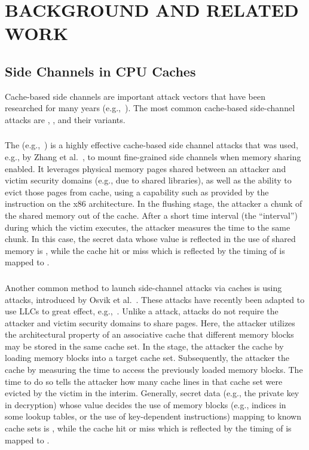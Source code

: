 \chapter{\uppercase{Background and Related Work}}
\label{chap:background}

\section{Side Channels in CPU Caches}
Cache-based side channels are important attack vectors that have been
researched for many years
(e.g.,~\cite{zhang2014cross,yarom2014flush,liu2015practical}).  The
most common cache-based side-channel attacks are \primeprobe,
\flushreload, and their variants.

\subsection{\flushreload}
The \flushreload (e.g.,~\cite{zhang2014cross,yarom2014flush})
is a highly effective cache-based side channel attacks that was used,
e.g., by Zhang et al.~\cite{zhang2014cross}, to mount fine-grained side
channels when memory sharing enabled.  It leverages physical memory
pages shared between an attacker and victim security domains (e.g.,
due to shared libraries), as well as the ability to evict those pages
from cache, using a capability such as provided by the \clflush
instruction on the x86 architecture. In the flushing stage, the
attacker  a chunk of the shared memory out of the cache.
After a short time interval (the ``\flushreload interval'') during
which the victim executes, the attacker measures the time to \Reload
the same chunk.  In this case, the secret data whose value is
reflected in the use of shared memory is \SecFn{}, while the cache hit
or miss which is reflected by the timing of \Reload is mapped to
\AOOFn{}.

\subsection{\primeprobe}
Another common method to launch side-channel attacks via caches is
using \primeprobe attacks, introduced by Osvik et
al.~\cite{osvik2006cache}.  These attacks have recently been adapted
to use \glspl{LLC} to great effect, e.g.,~\cite{liu2015practical,
irazoqui2015shared}.  Unlike a \flushreload attack, \primeprobe
attacks do not require the attacker and victim security domains to
share pages. Here, the attacker utilizes the architectural property of
an associative cache that different memory blocks may be stored in the
same cache set. In the \Prime stage, the attacker  the cache
by loading memory blocks into a target cache set.  Subsequently, the
attacker  the cache by measuring the time to access the
previously loaded memory blocks. The time to do so tells the attacker
how many cache lines in that cache set were evicted by the victim in
the interim.  Generally, secret data (e.g., the private key in
decryption) whose value decides the use of memory blocks (e.g.,
indices in some lookup tables, or the use of key-dependent
instructions) mapping to known cache sets is \SecFn{}, while the cache
hit or miss which is reflected by the timing of \Probe is mapped to
\AOOFn{}.

